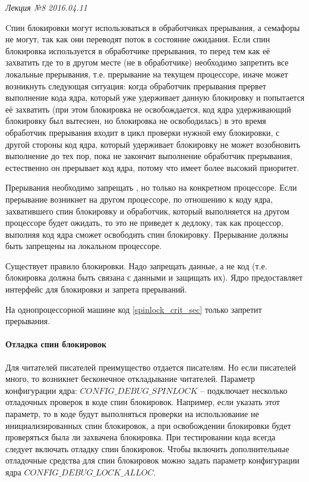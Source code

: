 \clearpage
\begin{flushright}
	\textit{Лекция №8}
	\textit{2016.04.11}
\end{flushright}

Cпин блокировки могут использоваться в обработчиках прерывания, а семафоры не могут, так как они переводят поток в состояние ожидания.
Если спин блокировка используется в обработчике прерывания, то перед тем как её захватить где то в другом месте (не в обработчике) необходимо запретить все локальные прерывания, т.е. прерывание на текущем процессоре, иначе может возникнуть следующая ситуация: когда обработчик прерывания прервет выполнение кода ядра, который уже удерживает данную блокировку  и попытается её захватить (при этом блокировка не освобождается, код ядра удерживающий блокировку был вытеснен, но блокировка не освободилась) в это время обработчик прерывания входит в цикл проверки нужной ему блокировки, с другой стороны код ядра, который удерживает блокировку не может возобновить выполнение до тех пор, пока не закончит выполнение обработчик прерывания, естественно он прерывает код ядра, потому что имеет более высокий приоритет. 

Прерывания необходимо запрещать , но только на конкретном процессоре. Если прерывание возникнет на другом процессоре, по отношению к коду ядра, захватившего спин блокировку и обработчик, который выполняется на другом процессоре будет ожидать, то это не приведет к дедлоку, так как процессор, выполняя код ядра сможет освободить спин блокировку. Прерывание должны быть запрещены на локальном процессоре. 

Существует правило блокировки. Надо запрещать данные, а не код (т.е. блокировка должна быть связана с данными и защищать их). Ядро предоставляет интерфейс для блокировки и запрета прерываний.

 

На однопроцессорной машине код \ref{spinlock_crit_sec} только запретит прерывания.

\paragraph{Отладка спин блокировок}

Для читателей писателей преимущество отдается писателям. Но если писателей много, то возникнет бесконечное откладывание читателей.
Параметр конфигурации ядра: $CONFIG\_DEBUG\_SPINLOCK$ – подключает несколько отладочных проверок в коде спин блокировок. Например, если указать этот параметр, то в коде будут выполняться проверки на использование не инициализированных спин блокировок, а при освобождении блокировки будет проверяться была ли захвачена блокировка. При тестировании кода всегда следует включать отладку спин блокировок. Чтобы включить дополнительные отладочные средства для спин блокировок можно задать параметр конфигурации ядра $CONFIG\_DEBUG\_LOCK\_ALLOC$.

